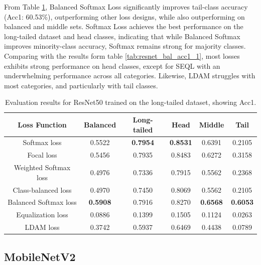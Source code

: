 From Table \ref{tab:resnet_lt_acc1_1}, Balanced Softmax Loss significantly improves tail-class accuracy (Acc1: 60.53\%), outperforming other loss designs, while also outperforming on balanced and middle sets. Softmax Loss achieves the best performance on the long-tailed dataset and head classes, indicating that while Balanced Softmax improves minority-class accuracy, Softmax remains strong for majority classes. Comparing with the results form table \ref{tab:resnet_bal_acc1_1}, most losses exhibits strong performance on head classes, except for SEQL with an underwhelming performance across all categories. Likewise, LDAM struggles with most categories, and particularly with tail classes.

\begin{table}[h!]
    \centering
    \caption{Evaluation results for ResNet50 trained on the long-tailed dataset, showing Acc1.}
    \small
    \begin{tabular}{cccccc}
        \toprule
        Loss Function & Balanced & Long-tailed & Head & Middle & Tail \\ 
        \midrule
        Softmax loss   & 0.5522 & \textbf{0.7954} & \textbf{0.8531} & 0.6391 & 0.2105 \\
        Focal loss   & 0.5456 & 0.7935 & 0.8483 & 0.6272 & 0.3158 \\
        Weighted Softmax loss   & 0.4976 & 0.7336 & 0.7915 & 0.5562 & 0.2368 \\
        Class-balanced loss   & 0.4970 & 0.7450 & 0.8069 & 0.5562 & 0.2105 \\
        Balanced Softmax loss   & \textbf{0.5908} & 0.7916 & 0.8270 & \textbf{0.6568} & \textbf{0.6053} \\
        Equalization loss   & 0.0886 & 0.1399 & 0.1505 & 0.1124 &  0.0263 \\
        LDAM loss   & 0.3742 & 0.5937 & 0.6469 & 0.4438 & 0.0789 \\
        \bottomrule
    \end{tabular}
    \label{tab:resnet_lt_acc1_1}
\end{table}


\subsection{MobileNetV2}

